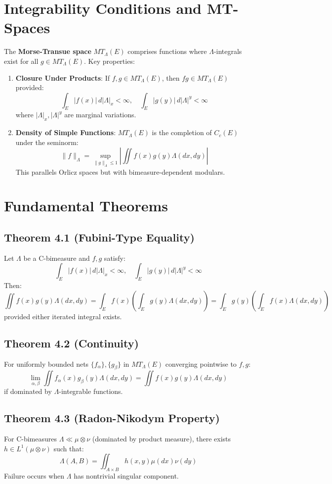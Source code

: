 \documentclass{article}
\begin{document}
\section{Integrability Conditions and MT-Spaces}
The \textbf{Morse-Transue space} $MT_\Lambda(E)$ comprises functions where $\Lambda$-integrals exist for all $g \in MT_\Lambda(E)$. Key properties:
\begin{enumerate}
\item \textbf{Closure Under Products}: If $f, g \in MT_\Lambda(E)$, then $fg \in MT_\Lambda(E)$ provided:
$$
\int_E |f(x)| \, d|\Lambda|_x < \infty, \quad \int_E |g(y)| \, d|\Lambda|^y < \infty
$$
where $|\Lambda|_x, |\Lambda|^y$ are marginal variations.

\item \textbf{Density of Simple Functions}: $MT_\Lambda(E)$ is the completion of $C_c(E)$ under the seminorm:
$$
\|f\|_\Lambda = \sup_{\|g\|_\Lambda \leq 1} \left| \iint f(x)g(y) \Lambda(dx, dy) \right|
$$
This parallels Orlicz spaces but with bimeasure-dependent modulars.
\end{enumerate}

\section{Fundamental Theorems}

\subsection{Theorem 4.1 (Fubini-Type Equality)}
Let $\Lambda$ be a C-bimeasure and $f, g$ satisfy:
$$
\int_E |f(x)| \, d|\Lambda|_x < \infty, \quad \int_E |g(y)| \, d|\Lambda|^y < \infty
$$
Then:
$$
\iint f(x)g(y) \Lambda(dx, dy) = \int_E f(x) \left( \int_E g(y) \Lambda(dx, dy) \right) = \int_E g(y) \left( \int_E f(x) \Lambda(dx, dy) \right)
$$
provided either iterated integral exists.

\subsection{Theorem 4.2 (Continuity)}
For uniformly bounded nets $\{f_\alpha\}, \{g_\beta\}$ in $MT_\Lambda(E)$ converging pointwise to $f, g$:
$$
\lim_{\alpha,\beta} \iint f_\alpha(x)g_\beta(y) \Lambda(dx, dy) = \iint f(x)g(y) \Lambda(dx, dy)
$$
if dominated by $\Lambda$-integrable functions.

\subsection{Theorem 4.3 (Radon-Nikodym Property)}
For C-bimeasures $\Lambda \ll \mu \otimes \nu$ (dominated by product measure), there exists $h \in L^1(\mu \otimes \nu)$ such that:
$$
\Lambda(A,B) = \iint_{A \times B} h(x,y) \mu(dx)\nu(dy)
$$
Failure occurs when $\Lambda$ has nontrivial singular component.
\end{document}

